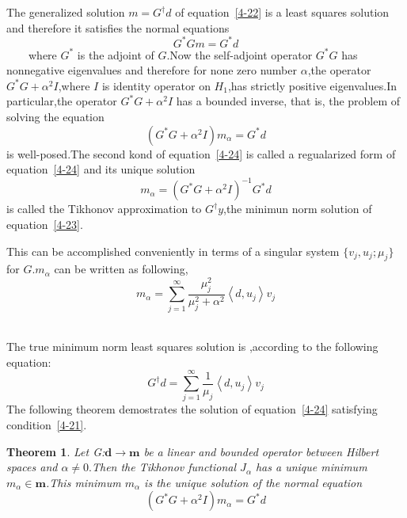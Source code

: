 \documentclass[a4paper]{article}
\newtheorem{theorem}{Theorem}
\newcommand{\tmem}[1]{{\em #1\/}}
\newcommand{\tmmathbf}[1]{\ensuremath{\boldsymbol{#1}}}
\begin{document}
The generalized solution $m = G^{\dagger} d$ of equation~\ref{4-22} is a least squares
solution and therefore it satisfies the normal equations
\begin{equation}
  G^{\ast} G m = G^{\ast} d
  \label{4-23}
\end{equation}
\ \ \ \ where $G^{\ast}$ is the adjoint of $G$.Now the self-adjoint operator
$G^{\ast} G$ has nonnegative eigenvalues and therefore for none zero number
$\alpha$,the operator $G^{\ast} G + \alpha^2 I$,where $I$ is identity operator
on $H_1$,has strictly positive eigenvalues.In particular,the operator
$G^{\ast} G + \alpha^2 I$ has a bounded inverse, that is, the problem of
solving the equation
\begin{equation}
  \left( G^{\ast} G + \alpha^2 I \right) m_{\alpha} = G^{\ast} d
  \label{4-24}
\end{equation}
is well-posed.The second kond of equation~\ref{4-24} is called a regualarized form
of equation~\ref{4-24} and its unique solution
\begin{equation}
  m_{\alpha} = \left( G^{\ast} G + \alpha^2 I \right)^{- 1} G^{\ast} d
\end{equation}
is called the Tikhonov approximation to $G^{\dagger} y$,the minimun norm
solution of equation~\ref{4-23}.

This can be accomplished conveniently in terms of a singular system $\{v_j,
u_j ; \mu_j \}$ for $G$.$m_{\alpha}$ can be written as following,
\begin{equation}
  m_{\alpha} = \sum^{\infty}_{j = 1} \frac{\mu_j^2}{\mu_j^2 + \alpha^2}
  \left\langle d, u_j \right\rangle v_j
\end{equation}
\ \ \

The true minimum norm least squares solution is ,according to the following
equation{\cite{6}}:
\begin{equation}
  G^{\dagger} d = \sum^{\infty}_{j = 1} \frac{1}{\mu_j^{}} \left\langle d, u_j
  \right\rangle v_j
\end{equation}
The following theorem demostrates the solution of equation~\ref{4-24} satisfying
condition~\ref{4-21}.

\begin{theorem}
  Let G:$\tmmathbf{d} \longrightarrow \tmmathbf{m}$ be a linear and bounded
  operator between Hilbert spaces and {\tmem{$\alpha \neq 0.$}}Then the
  Tikhonov functional $J_{\alpha}$ has a unique minimum $m_{\alpha} \in
  \tmmathbf{m}$.This minimum $m_{\alpha}$ is the unique solution of the normal
  equation
  \begin{equation}
    \left( G^{\ast} G + \alpha^2 I \right) m_{\alpha} = G^{\ast} d
  \end{equation}
\end{theorem}
\end{document}
